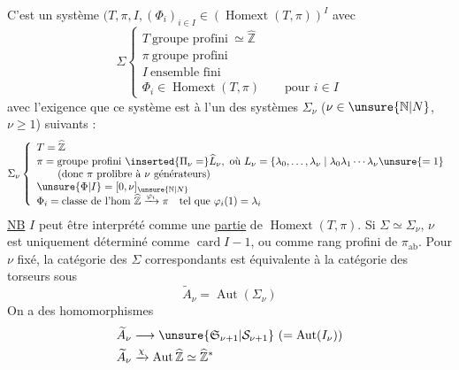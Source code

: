  C'est un système \inserted{$\Sigma=$}
$(T,\pi,I,(\Phi_i)_{i\in I}\in(\operatorname{Homext}(T,\pi))^I$
avec
\[\Sigma\left\{\begin{array}{l}
T\ \text{groupe profini}\ \simeq\widehat{\mathbb Z}\\
\pi\ \text{groupe profini}\\
I\ \text{ensemble fini}\\
\Phi_i\in\operatorname{Homext}(T,\pi)\qquad\text{pour }i\in I
\end{array}\right.\]
avec l'exigence que ce système est
à l'un des systèmes $\Sigma_\nu$ ($\nu\in\unsure{\mathbb N|N}$, $\nu\ge1$)
suivants :
\[\Sigma_\nu\left\{\begin{array}{l}
T=\widehat{\mathbb Z}\\
\pi=\text{groupe profini}\ \inserted{\Pi_\nu=}\widehat L_\nu,\ \text{où }L_\nu=\left\{\lambda_0,\ldots,\lambda_\nu\mid\lambda_0\lambda_1\cdots\lambda_\nu\unsure{=1}\right.\\
\qquad(\text{donc }\pi\text{ prolibre à }\nu\text{ générateurs})\\
\unsure{\Phi|I}=[0,\nu]_{\unsure{\mathbb N|N}}\\
\Phi_i=\text{classe de l'hom }\widehat{\mathbb Z}\xrightarrow{\varphi_i}\pi\quad\text{tel que }\varphi_i(1)=\lambda_i
\end{array}\right.\]
\uline{NB} $I$ peut être interprété comme une \uline{partie} de $\operatorname{Homext}(T,\pi)$.
Si $\Sigma\simeq\Sigma_\nu$, $\nu$ est uniquement déterminé
comme $\operatorname{card}I-1$, ou 
 comme rang profini de $\pi_{\mathrm{ab}}$.
Pour $\nu$ fixé, la catégorie des $\Sigma$ correspondants
est équivalente à la catégorie des torseurs
sous
\[\widetilde A_\nu=\operatorname{Aut}(\Sigma_\nu)\]
On a des homomorphismes
\[\begin{aligned}
\widetilde A_\nu&\longrightarrow\unsure{\mathfrak S_{\nu+1}|\mathcal S_{\nu+1}}\ (=\operatorname{Aut}(I_\nu))\\
\widetilde A_\nu&\xrightarrow{\chi}\operatorname{Aut}\widehat{\mathbb Z}\simeq\widehat{\mathbb Z}^*
\end{aligned}\]

